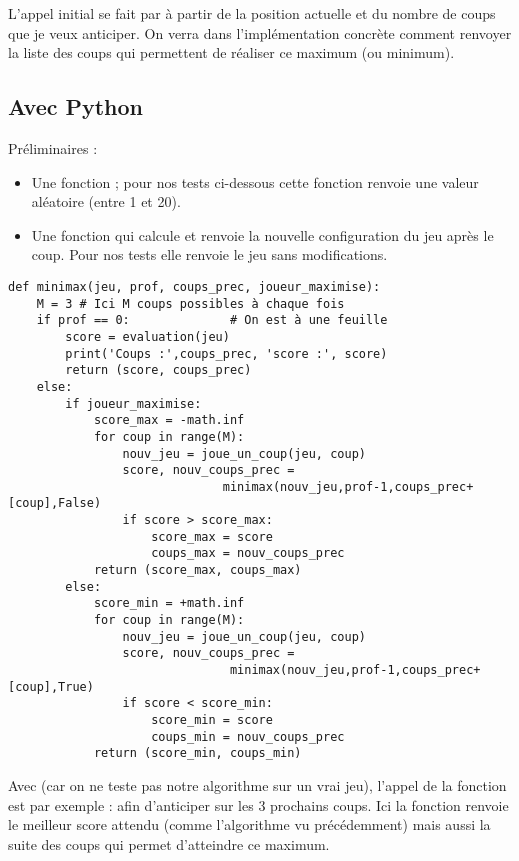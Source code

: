 \documentclass[11pt,class=report,crop=false]{standalone}
\begin{document}
L'appel initial se fait par 
à partir de la position  actuelle et du nombre de coups  que je veux anticiper.
On verra dans l'implémentation concrète comment renvoyer la liste des coups qui permettent de réaliser ce maximum (ou minimum).


\subsection{Avec Python}

Préliminaires :
\begin{itemize}
	\item Une fonction  ; pour nos tests ci-dessous cette fonction renvoie une valeur aléatoire (entre 1 et 20).
	\item Une fonction  qui calcule et renvoie la nouvelle configuration du jeu après le coup. Pour nos tests elle renvoie le jeu sans modifications.
\end{itemize}

\begin{lstlisting}
def minimax(jeu, prof, coups_prec, joueur_maximise):
    M = 3 # Ici M coups possibles à chaque fois
	if prof == 0:              # On est à une feuille
		score = evaluation(jeu)
		print('Coups :',coups_prec, 'score :', score)
		return (score, coups_prec)
	else:
		if joueur_maximise:
			score_max = -math.inf
			for coup in range(M):
				nouv_jeu = joue_un_coup(jeu, coup)
				score, nouv_coups_prec = 
				              minimax(nouv_jeu,prof-1,coups_prec+[coup],False)
				if score > score_max:
					score_max = score
					coups_max = nouv_coups_prec
			return (score_max, coups_max)
		else:
			score_min = +math.inf
			for coup in range(M):
				nouv_jeu = joue_un_coup(jeu, coup)
				score, nouv_coups_prec = 
				               minimax(nouv_jeu,prof-1,coups_prec+[coup],True)
				if score < score_min:
					score_min = score
					coups_min = nouv_coups_prec
			return (score_min, coups_min)
\end{lstlisting}

Avec  (car on ne teste pas notre algorithme sur un vrai jeu), l'appel de la fonction est par exemple :  afin d'anticiper sur les 3 prochains coups.
Ici la fonction renvoie le meilleur score attendu (comme l'algorithme vu précédemment) mais aussi la suite des coups qui permet d'atteindre ce maximum.
\end{document}
